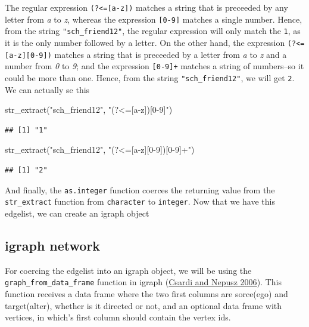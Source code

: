 \documentclass[
]{book}
\newenvironment{Shaded}{\begin{snugshade}}{\end{snugshade}}
\newcommand{\FunctionTok}[1]{\textcolor[rgb]{0.00,0.00,0.00}{#1}}
\newcommand{\NormalTok}[1]{#1}
\newcommand{\StringTok}[1]{\textcolor[rgb]{0.31,0.60,0.02}{#1}}
\begin{document}
\begin{enumerate}
  The regular expression \texttt{(?\textless{}={[}a-z{]})} matches a string that is preceeded by any letter from \emph{a} to \emph{z}, whereas the expression \texttt{{[}0-9{]}} matches a single number. Hence, from the string \texttt{"sch\_friend12"}, the regular expression will only match the \texttt{1}, as it is the only number followed by a letter. On the other hand, the expression \texttt{(?\textless{}={[}a-z{]}{[}0-9{]})} matches a string that is preceeded by a letter from \emph{a} to \emph{z} and a number from \emph{0} to \emph{9}; and the expression \texttt{{[}0-9{]}+} matches a string of numbers--so it could be more than one. Hence, from the string \texttt{"sch\_friend12"}, we will get \texttt{2}. We can actually se this

\begin{Shaded}
\begin{Highlighting}[]
\FunctionTok{str\_extract}\NormalTok{(}\StringTok{"sch\_friend12"}\NormalTok{, }\StringTok{"(?\textless{}=[a{-}z])[0{-}9]"}\NormalTok{)}
\end{Highlighting}
\end{Shaded}

\begin{verbatim}
## [1] "1"
\end{verbatim}

\begin{Shaded}
\begin{Highlighting}[]
\FunctionTok{str\_extract}\NormalTok{(}\StringTok{"sch\_friend12"}\NormalTok{, }\StringTok{"(?\textless{}=[a{-}z][0{-}9])[0{-}9]+"}\NormalTok{)}
\end{Highlighting}
\end{Shaded}

\begin{verbatim}
## [1] "2"
\end{verbatim}

  And finally, the \texttt{as.integer} function coerces the returning value from the \texttt{str\_extract} function from \texttt{character} to \texttt{integer}. Now that we have this edgelist, we can create an igraph object
\end{enumerate}

\hypertarget{igraph-network}{%
\subsection{igraph network}\label{igraph-network}}

For coercing the edgelist into an igraph object, we will be using the \texttt{graph\_from\_data\_frame} function in igraph (\protect\hyperlink{ref-R-igraph}{Csardi and Nepusz 2006}). This function receives a data frame where the two first columns are sorce(ego) and target(alter), whether is it directed or not, and an optional data frame with vertices, in which's first column should contain the vertex ids.
\end{document}
